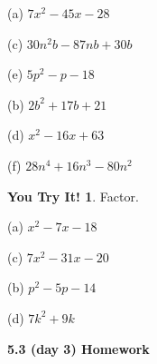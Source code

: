 \documentclass{report}
\theoremstyle{definition}
\newtheorem{youtry}{\textbf{You Try It!}}
\begin{document}
\begin{minipage}[t]{0.45\linewidth}
(a) $7x^2-45x-28$
\vspace{4cm}

(c) $30n^2b-87nb+30b$
\vspace{3cm}

(e) $5p^2-p-18$
\end{minipage}
\hfill
\begin{minipage}[t]{0.45\linewidth}
(b) $2b^2+17b+21$
\vspace{4cm}

(d) $x^2-16x+63$
\vspace{3cm}

(f) $28n^4+16n^3-80n^2$
\end{minipage}
\vspace{3cm}

\begin{youtry}
Factor.
\end{youtry}

\begin{minipage}[t]{0.45\linewidth}
(a) $x^2-7x-18$
\vspace{4cm}

(c) $7x^2-31x-20$
\end{minipage}
\hfill
\begin{minipage}[t]{0.45\linewidth}
(b) $p^2-5p-14$
\vspace{4cm}

(d) $7k^2+9k$
\end{minipage}
\vspace{4cm}


 \newpage


\noindent\large\textbf{5.3 (day 3) Homework}\normalsize\\
\end{document}
